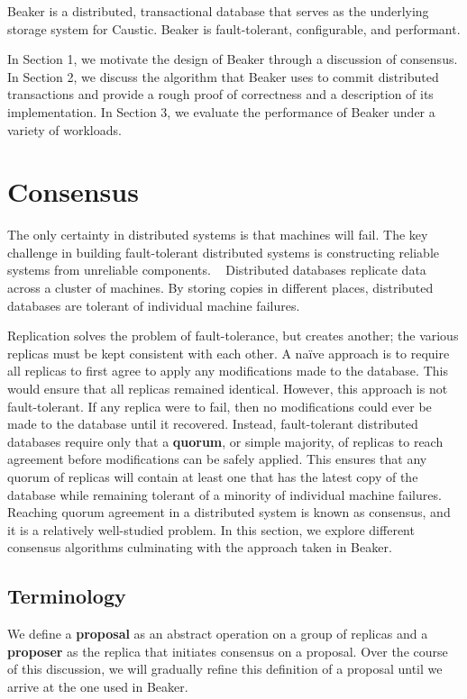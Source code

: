 \documentclass[../main.tex]{subfiles}
\begin{document}
Beaker is a distributed, transactional database that serves as the underlying storage system for
Caustic. Beaker is fault-tolerant, configurable, and performant.

In Section 1, we motivate the design of Beaker through a discussion of consensus. In Section
2, we discuss the algorithm that Beaker uses to commit distributed transactions and provide a rough
proof of correctness and a description of its implementation. In Section 3, we evaluate the
performance of Beaker under a variety of workloads.

\section{Consensus}
The only certainty in distributed systems is that machines will fail. The key challenge in building
fault-tolerant distributed systems is constructing reliable systems from unreliable components.
~\cite{reliability} Distributed databases replicate data across a cluster of machines. By storing
copies in different places, distributed databases are tolerant of individual machine failures.

Replication solves the problem of fault-tolerance, but creates another; the various replicas must be
kept consistent with each other. A na\"ive approach is to require all replicas to first agree to
apply any modifications made to the database. This would ensure that all replicas remained
identical. However, this approach is not fault-tolerant. If any replica were to fail, then no
modifications could ever be made to the database until it recovered. Instead, fault-tolerant
distributed databases require only that a \textbf{quorum}, or simple majority, of replicas to reach
agreement before modifications can be safely applied. This ensures that any quorum of replicas will
contain at least one that has the latest copy of the database while remaining tolerant of a minority
of individual machine failures. Reaching quorum agreement in a distributed system is known as
consensus, and it is a relatively well-studied problem. In this section, we explore different
consensus algorithms culminating with the approach taken in Beaker.

  \subsection{Terminology}
  We define a \textbf{proposal} as an abstract operation on a group of replicas and a
  \textbf{proposer} as the replica that initiates consensus on a proposal. Over the course of this
  discussion, we will gradually refine this definition of a proposal until we arrive at the one used
  in Beaker.
\end{document}
